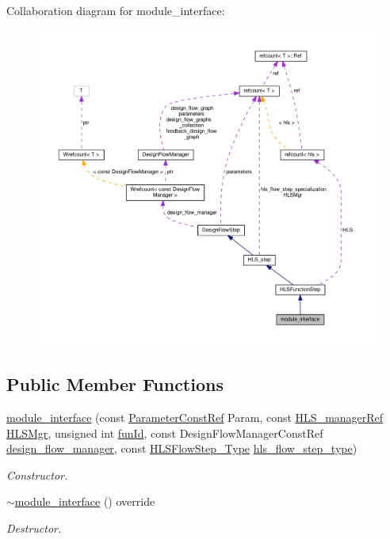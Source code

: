 Collaboration diagram for module\+\_\+interface\+:
\nopagebreak
\begin{figure}[H]
\begin{center}
\leavevmode
\includegraphics[width=350pt]{d3/d4c/classmodule__interface__coll__graph}
\end{center}
\end{figure}
\subsection*{Public Member Functions}
\begin{DoxyCompactItemize}
\item 
\hyperlink{classmodule__interface_a431ffd0a2b0d67a4d545a98cf75d6758}{module\+\_\+interface} (const \hyperlink{Parameter_8hpp_a37841774a6fcb479b597fdf8955eb4ea}{Parameter\+Const\+Ref} Param, const \hyperlink{hls__manager_8hpp_acd3842b8589fe52c08fc0b2fcc813bfe}{H\+L\+S\+\_\+manager\+Ref} \hyperlink{classHLS__step_ade85003a99d34134418451ddc46a18e9}{H\+L\+S\+Mgr}, unsigned int \hyperlink{classHLSFunctionStep_a3e6434fd86c698b0c70520b859bff5b0}{fun\+Id}, const Design\+Flow\+Manager\+Const\+Ref \hyperlink{classDesignFlowStep_ab770677ddf087613add30024e16a5554}{design\+\_\+flow\+\_\+manager}, const \hyperlink{hls__step_8hpp_ada16bc22905016180e26fc7e39537f8d}{H\+L\+S\+Flow\+Step\+\_\+\+Type} \hyperlink{classHLS__step_aefd59af15346ec3f10bf12bd756e6777}{hls\+\_\+flow\+\_\+step\+\_\+type})
\begin{DoxyCompactList}\small\item\em Constructor. \end{DoxyCompactList}\item 
\hyperlink{classmodule__interface_affdb64d9e2c9f16e5b07504cd5b650c7}{$\sim$module\+\_\+interface} () override
\begin{DoxyCompactList}\small\item\em Destructor. \end{DoxyCompactList}\end{DoxyCompactItemize}
